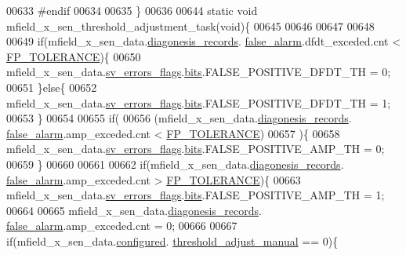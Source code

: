 \begin{DoxyCode}
00633 \textcolor{preprocessor}{#endif}
00634 
00635 \}
00636 
00644  \textcolor{keyword}{static} \textcolor{keywordtype}{void} mfield\_x\_sen\_threshold\_adjustment\_task(\textcolor{keywordtype}{void})\{
00645 
00646 
00647 
00648 
00649                 \textcolor{keywordflow}{if}(mfield\_x\_sen\_data.\hyperlink{a00025_a2bd79ce84bbd6b7f50d38954f7ae475e}{diagonesis\_records}.
      \hyperlink{a00019_a55109284fe950025b5d9f3dde60d4553}{false\_alarm}.dfdt\_exceded.cnt < \hyperlink{a00017_a946f0acff4fd16a65859479e9e0b9513}{FP\_TOLERANCE})\{
00650                      mfield\_x\_sen\_data.\hyperlink{a00025_aaeec6b0609dba31393f337abf1cce3d3}{sv\_errors\_flags}.\hyperlink{a00022_ab81eb6fb4f1351ed07b4d6c4dd6f1959}{bits}.FALSE\_POSITIVE\_DFDT\_TH      
        = 0;
00651                 \}\textcolor{keywordflow}{else}\{
00652                      mfield\_x\_sen\_data.\hyperlink{a00025_aaeec6b0609dba31393f337abf1cce3d3}{sv\_errors\_flags}.\hyperlink{a00022_ab81eb6fb4f1351ed07b4d6c4dd6f1959}{bits}.FALSE\_POSITIVE\_DFDT\_TH      
        = 1;
00653                 \}
00654 
00655                 \textcolor{keywordflow}{if}(
00656                   (mfield\_x\_sen\_data.\hyperlink{a00025_a2bd79ce84bbd6b7f50d38954f7ae475e}{diagonesis\_records}.
      \hyperlink{a00019_a55109284fe950025b5d9f3dde60d4553}{false\_alarm}.amp\_exceded.cnt < \hyperlink{a00017_a946f0acff4fd16a65859479e9e0b9513}{FP\_TOLERANCE})
00657                  )\{
00658                   mfield\_x\_sen\_data.\hyperlink{a00025_aaeec6b0609dba31393f337abf1cce3d3}{sv\_errors\_flags}.\hyperlink{a00022_ab81eb6fb4f1351ed07b4d6c4dd6f1959}{bits}.FALSE\_POSITIVE\_AMP\_TH  = 0;
00659                 \}
00660 
00661 
00662                 \textcolor{keywordflow}{if}(mfield\_x\_sen\_data.\hyperlink{a00025_a2bd79ce84bbd6b7f50d38954f7ae475e}{diagonesis\_records}.
      \hyperlink{a00019_a55109284fe950025b5d9f3dde60d4553}{false\_alarm}.amp\_exceded.cnt > \hyperlink{a00017_a946f0acff4fd16a65859479e9e0b9513}{FP\_TOLERANCE})\{
00663                   mfield\_x\_sen\_data.\hyperlink{a00025_aaeec6b0609dba31393f337abf1cce3d3}{sv\_errors\_flags}.\hyperlink{a00022_ab81eb6fb4f1351ed07b4d6c4dd6f1959}{bits}.FALSE\_POSITIVE\_AMP\_TH = 1;
00664 
00665                   mfield\_x\_sen\_data.\hyperlink{a00025_a2bd79ce84bbd6b7f50d38954f7ae475e}{diagonesis\_records}.
      \hyperlink{a00019_a55109284fe950025b5d9f3dde60d4553}{false\_alarm}.amp\_exceded.cnt = 0;
00666 
00667                  \textcolor{keywordflow}{if}(mfield\_x\_sen\_data.\hyperlink{a00025_a94b2d1f6ea4ab334c74d24984dd27843}{configured}.
      \hyperlink{a00021_a18e270a10094f045f20299b0f7e83085}{threshold\_adjust\_manual} == 0)\{

\end{DoxyCode}
